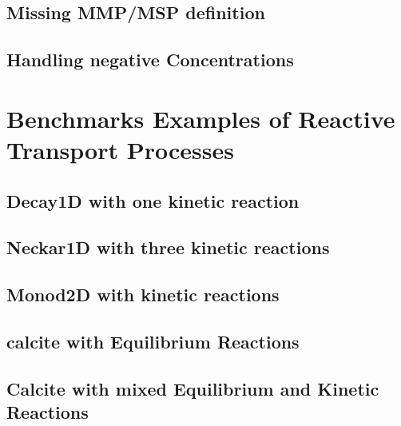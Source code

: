 \subsection{Missing MMP/MSP definition}

\subsection{Handling negative Concentrations}



\section{Benchmarks Examples of Reactive Transport Processes}
\label{sec:benchmarks}
\subsection{Decay1D with one kinetic reaction}

\subsection{Neckar1D with three kinetic reactions}

\subsection{Monod2D with kinetic reactions}

\subsection{calcite with Equilibrium Reactions}

\subsection{Calcite with mixed Equilibrium and Kinetic Reactions}